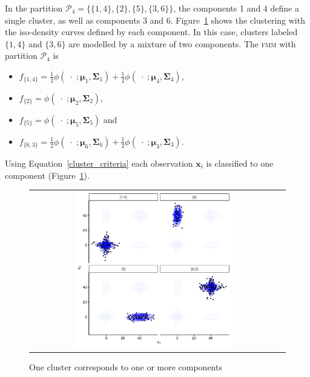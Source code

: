 \documentclass[10pt, a4paper]{article}
\newcommand{\m}[1]{\boldsymbol{#1}}
\newcommand{\fmm}{\textsc{fmm}\xspace}
\begin{document}
\begin{spacing}{1.9}
In the partition $\mathcal{P}_4 = \{ \{1, 4\},\{2\}, \{5\}, \{3, 6\} \}$, the components 1 and 4 define a single cluster, as well as components 3 and 6. Figure~\ref{ex_two_one} shows the clustering with the iso-density curves defined by each component. In this case, clusters labeled $\{1,4\}$ and $\{3, 6\}$ are modelled by a mixture of two components. The \fmm with partition $\mathcal{P}_4$ is
\begin{itemize}
\item $f_{\{1,4\}} = \frac{1}{2} \phi(\;\cdot\; ;  \m\mu_1, \m\Sigma_1) + \frac{1}{2} \phi(\;\cdot\; ;  \m\mu_4, \m\Sigma_4)$, 
\item $f_{\{2\}} = \phi(\;\cdot\; ;  \m\mu_2, \m\Sigma_2)$, 
\item $f_{\{5\}} = \phi(\;\cdot\; ;  \m\mu_5, \m\Sigma_5)$ and
\item $f_{\{6,3\}} = \frac{1}{2} \phi(\;\cdot\; ;  \m\mu_6, \m\Sigma_6) + \frac{1}{2} \phi(\;\cdot\; ;  \m\mu_3, \m\Sigma_3)$.
\end{itemize}

Using Equation~\ref{cluster_criteria} each observation $\m x_i$ is classified to one component (Figure~\ref{ex_two_one}).

\begin{figure}[h]
\begin{center}
\begin{tabular}{cc}
  \includegraphics[width=0.65\textwidth]{figures/partition-example-part4.pdf} \\
 \end{tabular}
 \caption{One cluster corresponds to one or more components}\label{ex_two_one}
\end{center}
\end{figure}



\end{spacing}
\end{document}
